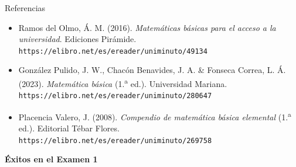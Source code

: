 \documentclass[aspectratio=169,10pt]{beamer}
\begin{document}
\begin{frame}{Referencias}
  \footnotesize
  \begin{itemize}
    \item[{[1]}] Ramos del Olmo, Á. M. (2016). \textit{Matemáticas básicas
      para el acceso a la universidad}. Ediciones Pirámide.
      \texttt{https://elibro.net/es/ereader/uniminuto/49134}
    \item[{[2]}] González Pulido, J. W., Chacón Benavides, J. A. \&
      Fonseca Correa, L. Á. (2023). \textit{Matemática básica} (1.\textsuperscript{a} ed.).
      Universidad Mariana.
      \texttt{https://elibro.net/es/ereader/uniminuto/280647}
    \item[{[3]}] Placencia Valero, J. (2008). \textit{Compendio de matemática
      básica elemental} (1.\textsuperscript{a} ed.). Editorial Tébar Flores.
      \texttt{https://elibro.net/es/ereader/uniminuto/269758}
  \end{itemize}

  \vspace{0.35cm}
  \begin{center}
    {\Large\color{uniAzul}\textbf{Éxitos en el Examen 1}}
  \end{center}
\end{frame}
\end{document}
